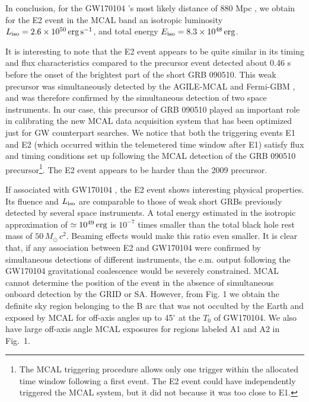 \documentclass[preprint2]{aastex}
\def\gw {GW170104 }
\def\gwp {GW170104}
\def \fv {}
\def \fvv {}
\def \mt {}
\begin{document}
{{\fvv In conclusion, for} the \gw's most likely distance of 880 Mpc \cite[][]{2017PhRvLsub}, we obtain {\fvv for the E2 event in the MCAL band} an isotropic luminosity
$L_{\rm iso} = 2.6 \times 10^{50} \, \rm erg \,  s^{-1}$, and total
energy $E_{\rm iso} = 8.3 \times 10^{48} \, \rm erg$.


It is interesting to note that the E2 event
appears to be quite similar in its timing and flux characteristics
compared to the precursor event detected about 0.46 s before the
onset of the brightest part of the short GRB 090510. This weak
precursor was simultaneously detected by the AGILE-MCAL and
Fermi-GBM \cite[][]{2009Natur.462..331A,2010ApJ...708L..84G}, and
was therefore confirmed by the simultaneous detection of two space
instruments. In our case, this precursor of GRB 090510 played an
important role in calibrating the new MCAL data acquisition system
that has been optimized just for GW counterpart searches. {\fv We
notice that both the triggering events E1 and E2 (which occurred
within the telemetered time window after E1) satisfy} flux and
timing conditions set up following the MCAL detection of the GRB
090510 precursor\footnote[5]{The MCAL triggering procedure allows
only one trigger within the allocated time window following a
first event. The E2 event could have independently triggered the
MCAL system, but it did not because it was too close to E1.}. The
E2 event appears to be harder than the 2009 precursor.

If %
{\mt associated} with \gw, the E2 event shows interesting physical
properties. Its fluence and $L_{\rm iso}$ are comparable to those
of weak short GRBs previously detected by several space
instruments. A total energy estimated in the isotropic
approximation of $\simeq 10^{49} \, \rm erg$ is $10^{-7}$ times
smaller than the total black hole rest mass of $50 \, M_{\odot} \,
c^2$. Beaming effects would make this ratio even smaller. It is
clear that, if any association between E2 and \gw were confirmed
by simultaneous detections of different instruments, the e.m.
output following the \gw gravitational coalescence would be
severely constrained. MCAL cannot determine the position of the
event in the absence of simultaneous onboard detection by the
GRID or SA. However, from Fig. 1 we obtain the {\mt definite} sky
region belonging to the B arc that was not occulted by the Earth
and exposed by MCAL {\fvv for off-axis angles up to 45$^{\circ}$} at the $T_0$ of \gwp.
{\fvv We also have large off-axis angle MCAL exposures for regions labeled
A1 and A2 in Fig.~1.}


}
\end{document}
